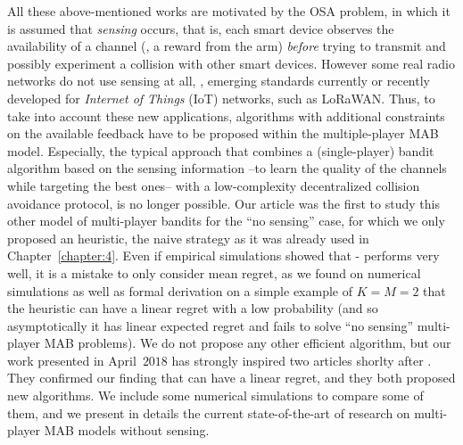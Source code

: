 All these above-mentioned works are motivated by the OSA problem, in which it is assumed that \emph{sensing} occurs, that is, each smart device observes the availability of a channel (\ie, a reward from the arm) \emph{before} trying to transmit and possibly experiment a collision with other smart devices.
However some real radio networks do not use sensing at all, \eg, emerging standards currently or recently developed for \emph{Internet of Things} (IoT) networks, such as LoRaWAN.
Thus, to take into account these new applications, algorithms with additional constraints on the available feedback have to be proposed within the multiple-player MAB model.
Especially, the typical approach that combines a (single-player) bandit algorithm based on the sensing information --to learn the quality of the channels while targeting the best ones-- with a low-complexity decentralized collision avoidance protocol, is no longer possible.
%
Our article \cite{Besson2018ALT} was the first to study this other model of multi-player bandits for the ``no sensing'' case,
for which we only proposed an heuristic, the naive \Selfish{} strategy as it was already used in Chapter~\ref{chapter:4}.
Even if empirical simulations showed that \Selfish-\klUCB{} performs very well, it is a mistake to only consider mean regret, as we found on numerical simulations as well as formal derivation on a simple example of $K=M=2$ that the \Selfish{} heuristic can have a linear regret with a low probability (and so asymptotically it has linear expected regret and fails to solve ``no sensing'' multi-player MAB problems).
We do not propose any other efficient algorithm, but our work presented in April~$2018$ has strongly inspired two articles shorlty after \cite{LugosiMehrabian18,BoursierPerchet18}.
They confirmed our finding that \Selfish{} can have a linear regret, and they both proposed new algorithms.
We include some numerical simulations to compare some of them, and we present in details the current state-of-the-art of research on multi-player MAB models without sensing.


